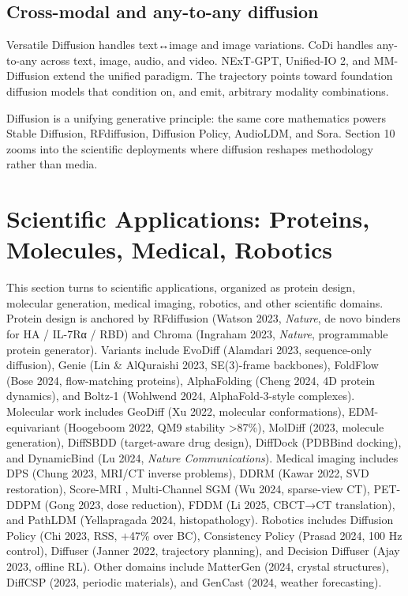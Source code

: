 \documentclass{article}
\begin{document}
\subsection{Cross-modal and any-to-any diffusion}\label{cross-modal-and-any-to-any-diffusion}

Versatile Diffusion \citep{xu2023versatilediffusion} handles text↔image and image variations. CoDi \citep{tang20232023} handles any-to-any across text, image, audio, and video. NExT-GPT, Unified-IO 2, and MM-Diffusion extend the unified paradigm. The trajectory points toward foundation diffusion models that condition on, and emit, arbitrary modality combinations.

Diffusion is a unifying generative principle: the same core mathematics powers Stable Diffusion, RFdiffusion, Diffusion Policy, AudioLDM, and Sora. Section 10 zooms into the scientific deployments where diffusion reshapes methodology rather than media.

\section{Scientific Applications: Proteins, Molecules, Medical, Robotics}\label{scientific-applications-proteins-molecules-medical-robotics}

This section turns to scientific applications, organized as protein design, molecular generation, medical imaging, robotics, and other scientific domains. Protein design is anchored by RFdiffusion (Watson 2023, \emph{Nature}, de novo binders for HA / IL-7Rα / RBD) and Chroma (Ingraham 2023, \emph{Nature}, programmable protein generator). Variants include EvoDiff (Alamdari 2023, sequence-only diffusion), Genie (Lin \& AlQuraishi 2023, SE(3)-frame backbones), FoldFlow (Bose 2024, flow-matching proteins), AlphaFolding (Cheng 2024, 4D protein dynamics), and Boltz-1 (Wohlwend 2024, AlphaFold-3-style complexes). Molecular work includes GeoDiff (Xu 2022, molecular conformations), EDM-equivariant (Hoogeboom 2022, QM9 stability \textgreater87\%), MolDiff (2023, molecule generation), DiffSBDD (target-aware drug design), DiffDock (PDBBind docking), and DynamicBind (Lu 2024, \emph{Nature Communications}). Medical imaging includes DPS (Chung 2023, MRI/CT inverse problems), DDRM (Kawar 2022, SVD restoration), Score-MRI \citep{chung2023diffusionposterior}, Multi-Channel SGM (Wu 2024, sparse-view CT), PET-DDPM (Gong 2023, dose reduction), FDDM (Li 2025, CBCT→CT translation), and PathLDM (Yellapragada 2024, histopathology). Robotics includes Diffusion Policy (Chi 2023, RSS, +47\% over BC), Consistency Policy (Prasad 2024, 100 Hz control), Diffuser (Janner 2022, trajectory planning), and Decision Diffuser (Ajay 2023, offline RL). Other domains include MatterGen (2024, crystal structures), DiffCSP (2023, periodic materials), and GenCast (2024, weather forecasting).
\end{document}

